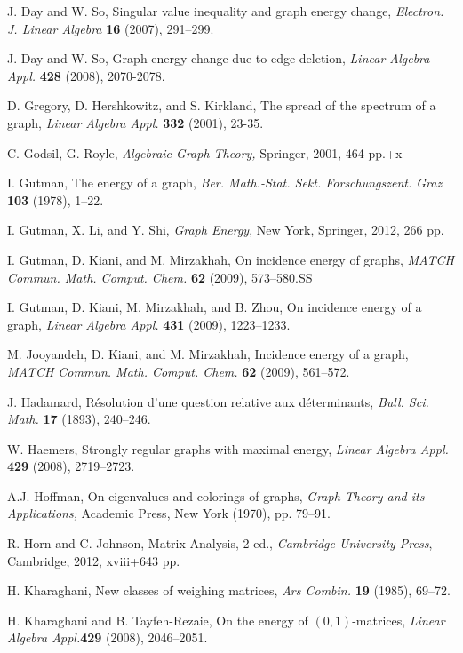 \documentclass[12pt]{article}%
\begin{document}
\begin{thebibliography}{99}
J. Day and W. So, Singular value inequality and graph energy
change, \emph{Electron. J. Linear Algebra} \textbf{16} (2007), 291--299.

J. Day and W. So, Graph energy change due to edge deletion,
\emph{Linear Algebra Appl.} \textbf{428} (2008), 2070-2078.

D. Gregory, D. Hershkowitz, and S. Kirkland, The spread of the
spectrum of a graph, \emph{Linear Algebra Appl.} \textbf{332} (2001), 23-35.

C. Godsil, G. Royle, \emph{Algebraic Graph Theory,} Springer,
2001, 464 pp.+x

I. Gutman, The energy of a graph, \emph{Ber. Math.-Stat. Sekt.
Forschungszent. Graz} \textbf{103} (1978), 1--22.

I. Gutman, X. Li, and Y. Shi, \emph{Graph Energy}, New York,
Springer, 2012, 266 pp.

I. Gutman, D. Kiani, and M. Mirzakhah, On incidence energy of
graphs, \emph{MATCH Commun. Math. Comput. Chem.} \textbf{62} (2009), 573--580.SS

I. Gutman, D. Kiani, M. Mirzakhah, and B. Zhou, On incidence
energy of a graph, \emph{Linear Algebra Appl.} \textbf{431} (2009), 1223--1233.

M. Jooyandeh, D. Kiani, and M. Mirzakhah, Incidence energy of
a graph, \emph{MATCH Commun. Math. Comput. Chem.} \textbf{62} (2009), 561--572.

J. Hadamard, R\'{e}solution d'une question relative aux
d\'{e}terminants, \emph{Bull. Sci. Math.} \textbf{17 }(1893), 240--246.

W. Haemers, Strongly regular graphs with maximal energy,
\emph{Linear Algebra Appl.} \textbf{429} (2008), 2719--2723.

A.J. Hoffman, On eigenvalues and colorings of graphs,
\emph{Graph Theory and its Applications,} Academic Press, New York (1970), pp. 79--91.

R. Horn and C. Johnson, Matrix Analysis, 2 ed.,
\emph{Cambridge University Press}, Cambridge, 2012, xviii+643 pp.

H. Kharaghani, New classes of weighing matrices, \emph{Ars
Combin. }\textbf{19} (1985), 69--72.

H. Kharaghani and B. Tayfeh-Rezaie, On the energy of
$(0,1)$-matrices, \emph{Linear Algebra Appl.}\textbf{429} (2008), 2046--2051.


\end{thebibliography}
\end{document}
